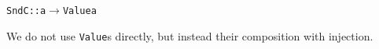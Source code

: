 \documentclass[9pt,preprint,authoryear]{sigplanconf}
\begin{document}
{{{}\vphantom{$\{$}}}\textcolor[rgb]{0,0,0.80}{\texttt{\mbox{\hspace{0.50em}}}}\textcolor[rgb]{0,0,0.80}{\texttt{\mbox{\hspace{0.50em}}}}\textcolor[rgb]{0.70,0.13,0.13}{\texttt{SndC}}\textcolor[rgb]{0,0,0.80}{\texttt{\mbox{\hspace{0.50em}}}}\textcolor[rgb]{0,0,0.80}{\texttt{\mbox{\hspace{0.50em}}}}\textcolor[cmyk]{0,0.65,0.99,0}{\texttt{{:}{:}}}\textcolor[rgb]{0,0,0.80}{\texttt{\mbox{\hspace{0.50em}}}}\textcolor[rgb]{0,0,0.80}{\texttt{a}}\textcolor[rgb]{0,0,0.80}{\texttt{\mbox{\hspace{0.50em}}}}\textcolor[cmyk]{0,0.65,0.99,0}{\texttt{$ \rightarrow $}}\textcolor[rgb]{0,0,0.80}{\texttt{\mbox{\hspace{0.50em}}}}\textcolor[rgb]{0,0,0.80}{\texttt{Value}}\textcolor[rgb]{0,0,0.80}{\texttt{\mbox{\hspace{0.50em}}}}\textcolor[rgb]{0,0,0.80}{\texttt{a}}\textcolor[rgb]{0,0,0.80}{\texttt{{\nopagebreak \newline%
}\vphantom{$\{$}}}%


%
We do not use \textcolor[rgb]{0,0,0.80}{\texttt{Value}}s directly, but instead their composition with injection.%


{\nopagebreak }
\end{document}
